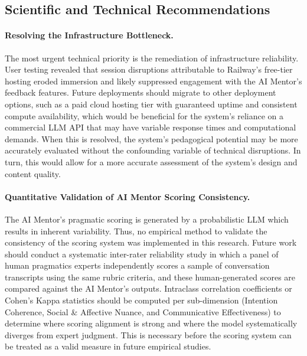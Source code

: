 \subsection{Scientific and Technical Recommendations}\label{subsec:sci-tech-rec}

\paragraph{Resolving the Infrastructure Bottleneck.}

The most urgent technical priority is the remediation of infrastructure reliability.
User testing revealed that session disruptions attributable to Railway's free-tier
hosting eroded immersion and likely suppressed engagement with the AI Mentor's
feedback features. Future deployments should migrate to other deployment options, such as a paid cloud hosting tier
with guaranteed uptime and consistent compute availability, which would be beneficial for the
system's reliance on a commercial LLM API that may have variable response times and computational demands. When this is resolved,
the system's pedagogical potential may be more accurately evaluated without the confounding variable of technical disruptions. 
In turn, this would allow for a more accurate assessment of the system's design and content quality.

\paragraph{Quantitative Validation of AI Mentor Scoring Consistency.}

The AI Mentor's pragmatic scoring is generated by a probabilistic LLM which results in inherent variability. Thus, 
no empirical method to validate the consistency of the scoring system was implemented in this research.
Future work should conduct a systematic inter-rater reliability study in which a
panel of human pragmatics experts independently scores a sample of conversation
transcripts using the same rubric criteria, and these human-generated scores are compared 
against the AI Mentor's outputs. Intraclass correlation coefficients or Cohen's
Kappa statistics should be computed per sub-dimension (Intention Coherence, Social
\& Affective Nuance, and Communicative Effectiveness) to determine where scoring
alignment is strong and where the model systematically diverges from expert
judgment. This is necessary before the scoring system can be treated as a valid
measure in future empirical studies.

